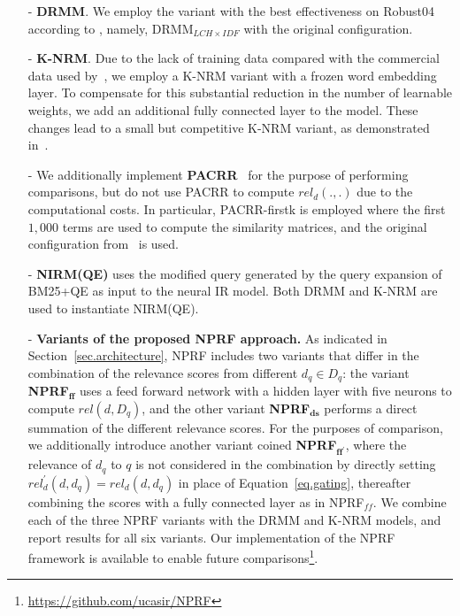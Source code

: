 \documentclass[11pt,a4paper]{article}
\begin{document}
\begin{itemize}[leftmargin=*]

\item[-] 
\noindent \textbf{DRMM}. We employ the variant with the best effectiveness on Robust04
according to \cite{DBLP:conf/cikm/GuoFAC16}, namely, 
DRMM$_{LCH\times IDF}$ with the original configuration.

\item[-] 
\noindent \textbf{K-NRM}.
Due to the lack of training data compared with the commercial data used by~\cite{DBLP:conf/sigir/XiongDCLP17}, we employ a K-NRM variant with a frozen word embedding layer.
To compensate for this substantial reduction in the number of learnable weights,
we add an additional fully connected layer to the model.
These changes lead to a small but competitive K-NRM variant, as demonstrated in~\cite{DBLP:conf/wsdm/HuiYBM18}.

\item[-]
\noindent We additionally implement \textbf{PACRR}~\cite{DBLP:conf/emnlp/HuiYBM17}
for the purpose of performing comparisons, but do not use PACRR to compute
$rel_d(.,.)$ due to the computational costs.
In particular, PACRR-firstk is employed where the first $1,000$ terms
are used to compute the similarity matrices, and the original configuration from~\cite{DBLP:conf/emnlp/HuiYBM17} is used.

\item[-] 
\noindent \textbf{NIRM(QE)} uses the modified query generated by the query expansion of BM25+QE \cite{DBLP:conf/trec/YeHHYL09} 
as input to the neural IR model. Both DRMM and K-NRM are used to instantiate NIRM(QE).



\item[-]
\noindent \textbf{Variants of the proposed NPRF approach.}
As indicated in Section~\ref{sec.architecture},
NPRF includes two variants that differ in the combination of the relevance scores from different $d_q\in D_q$:
the variant {\bf NPRF}$\mathbf{_\ensuremath{\mathbf{ff}}}$ 
uses a feed forward network with a hidden layer with five neurons to compute $rel(d, D_q)$,
and the other variant {\bf NPRF}$\mathbf{_{ds}}$ performs a direct summation of the different relevance scores.
For the purposes of comparison, we additionally
introduce another variant coined {\bf NPRF}$\mathbf{_{\ensuremath{\mathbf{ff}}^\prime}}$, where 
the relevance of $d_q$ to $q$ is not considered in the combination by 
directly setting $rel_d^\prime(d, d_q)=rel_d(d, d_q)$ in place of
Equation~\ref{eq.gating}, 
thereafter combining the scores with a fully connected layer as in  NPRF$_{\ensuremath{\mathit{ff}}}$.
We combine each of the three NPRF variants with the DRMM and K-NRM models,
and report results for all six variants.
Our implementation of the NPRF framework is available to enable future comparisons\footnote{\url{https://github.com/ucasir/NPRF}}.

\end{itemize}
\end{document}
